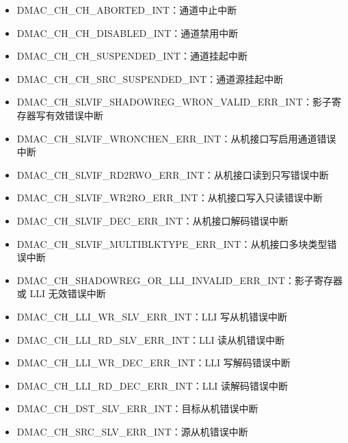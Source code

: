 \documentclass[main\_\_CN.tex]{subfiles}
\begin{document}
\begin{itemize}
    \begin{itemize}
        \item \label{int:DMACCHNCHABORTEDINT}DMAC\_CH\_CH\_ABORTED\_INT：通道中止中断
        \item \label{int:DMACCHNCHDISABLEDINT}DMAC\_CH\_CH\_DISABLED\_INT：通道禁用中断
        \item \label{int:DMACCHNCHSUSPENDEDINT}DMAC\_CH\_CH\_SUSPENDED\_INT：通道挂起中断
        \item \label{int:DMACCHNCHSRCSUSPENDEDINT}DMAC\_CH\_CH\_SRC\_SUSPENDED\_INT：通道源挂起中断
        \item \label{int:DMACCHNSLVIFSHADOWREGWRONVALIDERRINT}DMAC\_CH\_SLVIF\_SHADOWREG\_WRON\_VALID\_ERR\_INT：影子寄存器写有效错误中断
        \item \label{int:DMACCHNSLVIFWRONCHENERRINT}DMAC\_CH\_SLVIF\_WRONCHEN\_ERR\_INT：从机接口写启用通道错误中断
        \item \label{int:DMACCHNSLVIFRD2RWOERRINT}DMAC\_CH\_SLVIF\_RD2RWO\_ERR\_INT：从机接口读到只写错误中断
        \item \label{int:DMACCHNSLVIFWR2ROERRINT}DMAC\_CH\_SLVIF\_WR2RO\_ERR\_INT：从机接口写入只读错误中断
        \item \label{int:DMACCHNSLVIFDECERRINT}DMAC\_CH\_SLVIF\_DEC\_ERR\_INT：从机接口解码错误中断
        \item \label{int:DMACCHNSLVIFMULTIBLKTYPEERRINT}DMAC\_CH\_SLVIF\_MULTIBLKTYPE\_ERR\_INT：从机接口多块类型错误中断
        \item \label{int:DMACCHNSHADOWREGORLLIINVALIDERRINT}DMAC\_CH\_SHADOWREG\_OR\_LLI\_INVALID\_ERR\_INT：影子寄存器或 LLI 无效错误中断
        \item \label{int:DMACCHNLLIWRSLVERRINT}DMAC\_CH\_LLI\_WR\_SLV\_ERR\_INT：LLI 写从机错误中断
        \item \label{int:DMACCHNLLIRDSLVERRINT}DMAC\_CH\_LLI\_RD\_SLV\_ERR\_INT：LLI 读从机错误中断
        \item \label{int:DMACCHNLLIWRDECERRINT}DMAC\_CH\_LLI\_WR\_DEC\_ERR\_INT：LLI 写解码错误中断
        \item \label{int:DMACCHNLLIRDDECERRINT}DMAC\_CH\_LLI\_RD\_DEC\_ERR\_INT：LLI 读解码错误中断
        \item \label{int:DMACCHNDSTSLVERRINT}DMAC\_CH\_DST\_SLV\_ERR\_INT：目标从机错误中断
        \item \label{int:DMACCHNSRCSLVERRINT}DMAC\_CH\_SRC\_SLV\_ERR\_INT：源从机错误中断

\end{itemize}
\end{itemize}
\end{document}
